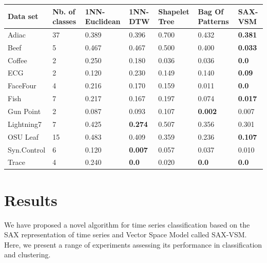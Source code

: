 \documentclass[conference]{IEEEtran}
\begin{document}
\begin{footnotesize}
\begin{table}[t]
\begin{tabularx}{\linewidth}{@{} l *6X @{}}
Data set & Nb. of classes & 1NN-Euclidean & 1NN-DTW & Shapelet Tree &  Bag Of \mbox{Patterns} & SAX-VSM\\\midrule
Adiac             &37  & 0.389   & 0.396           & 0.700        & 0.432         & \textbf{0.381}\\
Beef              &5   & 0.467   & 0.467           & 0.500        & 0.400         & \textbf{0.033}\\
Coffee           &2    & 0.250   & 0.180           & 0.036     & 0.036     & \textbf{0.0} \\
ECG               &2   & 0.120   & 0.230           & 0.149     & 0.140   & \textbf{0.09} \\
FaceFour        &4     & 0.216   & 0.170           & 0.159     & 0.011   & \textbf{0.0} \\
Fish               &7   & 0.217   & 0.167           & 0.197    & 0.074   & \textbf{0.017} \\
Gun Point      &2      & 0.087   & 0.093           & 0.107     & \textbf{0.002}     & 0.007 \\
Lightning7     &7      & 0.425   & \textbf{0.274}  & 0.507     & 0.356            & 0.301 \\
OSU Leaf      &15   & 0.483   & 0.409  & 0.359     & 0.236            & \textbf{0.107} \\
Syn.Control  &6   & 0.120   & \textbf{0.007}  & 0.057     & 0.037            & 0.010 \\
Trace            &4   & 0.240   & \textbf{0.0}    & 0.020     & \textbf{0.0}            & \textbf{0.0} \\

\bottomrule[1pt]
\end{tabularx}
\end{table}
\end{footnotesize}

\section{Results} \label{results}
We have proposed a novel algorithm for time series classification based on the SAX
representation of time series and Vector Space Model called SAX-VSM. Here, we present 
a range of experiments assessing its performance in classification and clustering.
\end{document}

